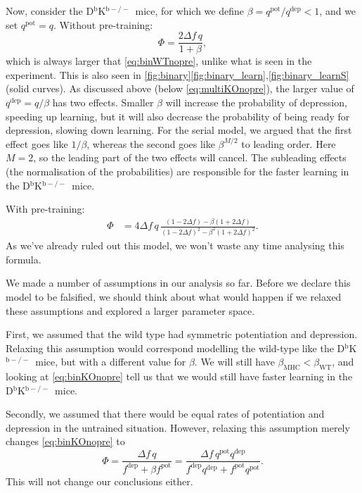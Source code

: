 \documentclass[12pt]{article}
\newcommand{\pot}{^{\text{pot}}}
\newcommand{\dep}{^{\text{dep}}}
\newcommand{\wt}{_{\text{WT}}}
\newcommand{\KO}{D$^\mathrm{b}$K$^{\mathrm{b}-/-}$}
\newcommand{\ko}{_{\text{MHC}}}
\begin{document}
Now, consider the \KO\ mice, for which we define $\beta=q\pot/q\dep<1$, and we set $q\pot=q$.
Without pre-training:
%
\begin{equation}\label{eq:binKOnopre}
  \Phi = \frac{2{\Delta f}\, q}{1+\beta},
\end{equation}
%
which is always larger that \eqref{eq:binWTnopre}, unlike what is seen in the experiment.
This is also seen in \autoref{fig:binary}\ref{fig:binary_learn},\ref{fig:binary_learnS} (solid curves).
As discussed above (below \eqref{eq:multiKOnopre}), the larger value of $q\dep=q/\beta$ has two effects.
Smaller $\beta$ will increase the probability of depression, speeding up learning, but it will also decrease the probability of being ready for depression, slowing down learning.
For the serial model, we argued that the first effect goes like $1/\beta$, whereas the second goes like $\beta^{M/2}$ to leading order.
Here $M=2$, so the leading part of the two effects will cancel.
The subleading effects (the normalisation of the probabilities) are responsible for the faster learning in the \KO\ mice.

With pre-training:
%
\begin{equation}\label{eq:binKOpre}
\begin{aligned}
  \Phi &= 4{\Delta f}\, q \, \frac{(1-2\Delta f) - \beta(1+2\Delta f)}
          {(1-2\Delta f)^2 - \beta^2(1+2\Delta f)^2}.
\end{aligned}
\end{equation}
%
As we've already ruled out this model, we won't waste any time analysing this formula.

We made a number of assumptions in our analysis so far.
Before we declare this model to be falsified, we should think about what would happen if we relaxed these assumptions and explored a larger parameter space.

First, we assumed that the wild type had symmetric potentiation and depression.
Relaxing this assumption would correspond modelling the wild-type like the \KO\ mice, but with a different value for $\beta$.
We will still have $\beta\ko<\beta\wt$, and looking at \eqref{eq:binKOnopre} tell us that we would still have faster learning in the \KO\ mice.

Secondly, we assumed that there would be equal rates of potentiation and depression in the untrained situation.
However, relaxing this assumption merely changes \eqref{eq:binKOnopre} to
%
\begin{equation}\label{eq:binKOnoprediff}
  \Phi = \frac{{\Delta f}\, q}{f\dep+\beta f\pot} = \frac{{\Delta f}\, q\pot q\dep}{f\dep q\dep+ f\pot q\pot}.
\end{equation}
%
This will not change our conclusions either.
\end{document}
